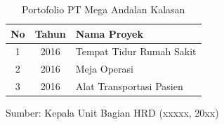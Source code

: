 \clearpage
\begin{table}[H]
  \centering
  \caption{Portofolio PT Mega Andalan Kalasan}
  \label{tab:portofolio}
  \begin{tabularx}{\textwidth}{|c|c|X|}
    \hline
    No & Tahun & Nama Proyek \\
    \hline
    1 & 2016 & Tempat Tidur Rumah Sakit \\
    \hline
    2 & 2016 & Meja Operasi \\
    \hline
    3 & 2016 & Alat Transportasi Pasien \\
    \hline
  \end{tabularx}

  \vspace{0.5ex}
  {\fontsize{10}{12}\selectfont Sumber: Kepala Unit Bagian HRD (xxxxx, 20xx)\par}
\end{table}
